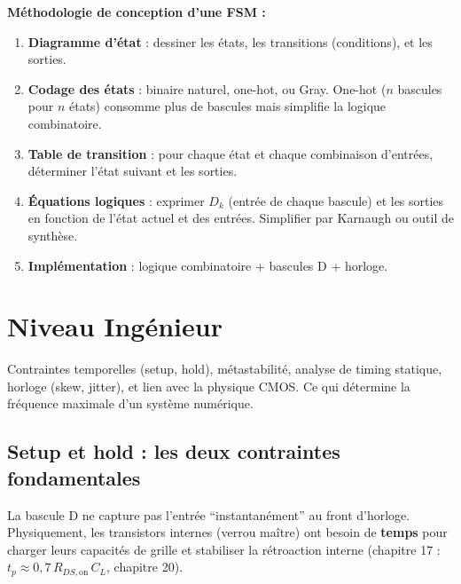\documentclass[12pt,a4paper,twoside]{book}
\begin{document}
\begin{pratique}
\textbf{Méthodologie de conception d'une FSM :}
\begin{enumerate}[nosep]
\item \textbf{Diagramme d'état} : dessiner les états, les transitions (conditions), et les sorties.
\item \textbf{Codage des états} : binaire naturel, one-hot, ou Gray. One-hot ($n$ bascules pour $n$ états) consomme plus de bascules mais simplifie la logique combinatoire.
\item \textbf{Table de transition} : pour chaque état et chaque combinaison d'entrées, déterminer l'état suivant et les sorties.
\item \textbf{Équations logiques} : exprimer $D_k$ (entrée de chaque bascule) et les sorties en fonction de l'état actuel et des entrées. Simplifier par Karnaugh ou outil de synthèse.
\item \textbf{Implémentation} : logique combinatoire + bascules D + horloge.
\end{enumerate}
\end{pratique}

\section{Niveau Ingénieur}

\begin{ingenieur}
Contraintes temporelles (setup, hold), métastabilité, analyse de timing statique, horloge (skew, jitter), et lien avec la physique CMOS. Ce qui détermine la fréquence maximale d'un système numérique.
\end{ingenieur}

\subsection{Setup et hold : les deux contraintes fondamentales}

\begin{attention}
La bascule D ne capture pas l'entrée ``instantanément'' au front d'horloge. Physiquement, les transistors internes (verrou maître) ont besoin de \textbf{temps} pour charger leurs capacités de grille et stabiliser la rétroaction interne (chapitre 17 : $t_p \approx 0{,}7\,R_{DS,\text{on}}\,C_L$, chapitre 20).
\end{attention}
\end{document}
